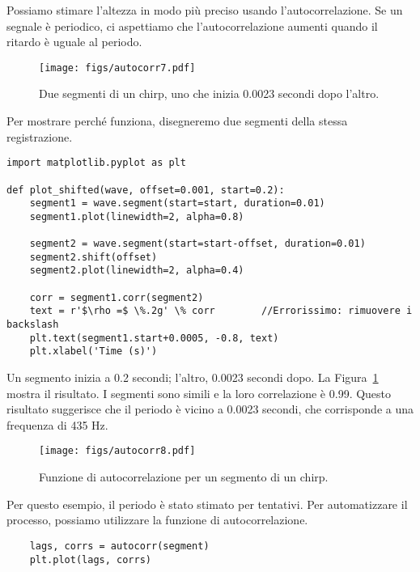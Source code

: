 \documentclass[12pt]{book} \usepackage[width=5.5in,height=8.5in, hmarginratio=3:2,vmarginratio=1:1]{geometry}
\begin{document}
Possiamo stimare l'altezza in modo più preciso usando l'autocorrelazione. Se un segnale è periodico, ci aspettiamo che l'autocorrelazione aumenti quando il ritardo è uguale al periodo.

\begin{figure} 

\centerline{\texttt{[image: figs/autocorr7.pdf]}} \caption{Due segmenti di un chirp, uno che inizia 0.0023 secondi dopo l'altro.} \label{fig.autocorr7} \end{figure} 

Per mostrare perché funziona, disegneremo due segmenti della stessa registrazione.

\begin{verbatim} 
import matplotlib.pyplot as plt

def plot_shifted(wave, offset=0.001, start=0.2):
    segment1 = wave.segment(start=start, duration=0.01)
    segment1.plot(linewidth=2, alpha=0.8)

    segment2 = wave.segment(start=start-offset, duration=0.01)
    segment2.shift(offset)
    segment2.plot(linewidth=2, alpha=0.4)

    corr = segment1.corr(segment2)
    text = r'$\rho =$ \%.2g' \% corr        //Errorissimo: rimuovere i backslash
    plt.text(segment1.start+0.0005, -0.8, text)
    plt.xlabel('Time (s)')
 \end{verbatim} 

Un segmento inizia a 0.2 secondi; l'altro, 0.0023 secondi dopo. La Figura~\ref{fig.autocorr7} mostra il risultato. I segmenti sono simili e la loro correlazione è 0.99. Questo risultato suggerisce che il periodo è vicino a 0.0023 secondi, che corrisponde a una frequenza di 435 Hz.

\begin{figure} 

\centerline{\texttt{[image: figs/autocorr8.pdf]}} \caption{Funzione di autocorrelazione per un segmento di un chirp.} \label{fig.autocorr8} \end{figure} 

Per questo esempio, il periodo è stato stimato per tentativi. Per automatizzare il processo, possiamo utilizzare la funzione di autocorrelazione.

\begin{verbatim} 
    lags, corrs = autocorr(segment)
    plt.plot(lags, corrs)
 \end{verbatim} 
\end{document}
